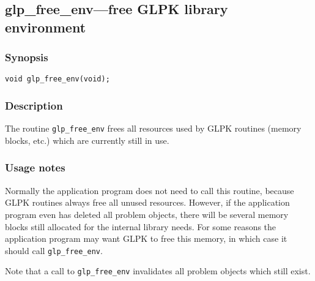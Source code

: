 \subsection{glp\_free\_env---free GLPK library environment}

\subsubsection*{Synopsis}

\begin{verbatim}
void glp_free_env(void);
\end{verbatim}

\subsubsection*{Description}

The routine \verb|glp_free_env| frees all resources used by GLPK
routines (memory blocks, etc.) which are currently still in use.

\subsubsection*{Usage notes}

Normally the application program does not need to call this routine,
because GLPK routines always free all unused resources. However, if
the application program even has deleted all problem objects, there
will be several memory blocks still allocated for the internal library
needs. For some reasons the application program may want GLPK to free
this memory, in which case it should call \verb|glp_free_env|.

Note that a call to \verb|glp_free_env| invalidates all problem objects
which still exist.

